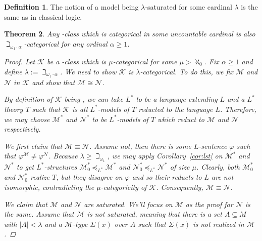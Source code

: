 \documentclass{amsart}
\newtheorem{theorem}{Theorem}[section]
\theoremstyle{definition}
\newtheorem{definition}[theorem]{Definition}
\numberwithin{equation}{theorem}
\renewcommand{\phi}{\varphi}
\begin{document}
  \begin{definition}
    The notion of a model being $\lambda$-saturated for some cardinal $\lambda$ is the same as in classical logic.
  \end{definition}
  
  \begin{theorem}
    Any \PCd-class which is categorical in some uncountable cardinal is also $\beth_{\omega_1\cdot\alpha}$-categorical for any ordinal $\alpha\geq 1$.
    \begin{proof}
      Let $\mathcal K$ be a \PCd-class which is $\mu$-categorical for some $\mu>\aleph_0$.
      Fix $\alpha\geq 1$ and define $\lambda:=\beth_{\omega_1\cdot\alpha}$.
      We need to show $\mathcal K$ is $\lambda$-categorical.
      To do this, we fix $\mathcal M$ and $\mathcal N$ in $\mathcal K$ and show that $\mathcal M\cong\mathcal N$.
      
      By definition of $\mathcal K$ being \PCd, we can take $L^*$ to be a language extending $L$ and a $L^*$-theory $T$ such that $\mathcal K$ is all $L^*$-models of $T$ reducted to the language $L$.
      Therefore, we may choose $\mathcal M^*$ and $\mathcal N^*$ to be $L^*$-models of $T$ which reduct to $\mathcal M$ and $\mathcal N$ respectively.
      
      We first claim that $\mathcal M\equiv\mathcal N$.
      Assume not, then there is some $L$-sentence $\phi$ such that $\phi^\mathcal M\neq\phi^\mathcal N$.
      Because $\lambda\geq\beth_{\omega_1}$, we may apply Corollary~\ref{cor:lst} on $\mathcal M^*$ and $\mathcal N^*$ to get $L^*$-structures $\mathcal M^*_0\preceq_{L^*}\mathcal M^*$ and $\mathcal N^*_0\preceq_{L^*}\mathcal N^*$ of size $\mu$.
      Clearly, both $\mathcal M_0^*$ and $\mathcal N_0^*$ realize $T$, but they disagree on $\phi$ and so their reducts to $L$ are not isomorphic, contradicting the $\mu$-categoricity of $\mathcal K$.
      Consequently, $\mathcal M\equiv\mathcal N$.
      
      We claim that $\mathcal M$ and $\mathcal N$ are saturated.
      We'll focus on $\mathcal M$ as the proof for $\mathcal N$ is the same.
      Assume that $\mathcal M$ is not saturated, meaning that there is a set $A\subseteq M$ with $|A|<\lambda$ and a $\mathcal M$-type $\Sigma(x)$ over $A$ such that $\Sigma(x)$ is not realized in $\mathcal M$.
      

\end{proof}
\end{theorem}
\end{document}
